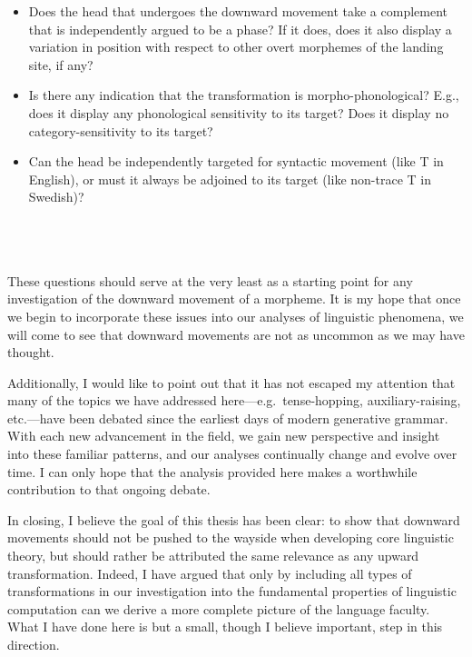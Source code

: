 \singlespacing
\begin{minipage}{5in}
\begin{itemize}
\item Does the head that undergoes the downward movement take a complement that is independently argued to be a phase? If it does, does it also display a variation in position with respect to other overt morphemes of the landing site, if any?
\item Is there any indication that the transformation is morpho-phonological? E.g., does it display any phonological sensitivity to its target? Does it display no category-sensitivity to its target?
\item Can the head be independently targeted for syntactic movement (like T in English), or must it always be adjoined to its target (like non-trace T in Swedish)?
\end{itemize}
\end{minipage}\\\\\\
\onehalfspacing
These questions should serve at the very least as a starting point for any investigation of the downward movement of a morpheme. It is my hope that once we begin to incorporate these issues into our analyses of linguistic phenomena, we will come to see that downward movements are not as uncommon as we may have thought.

Additionally, I would like to point out that it has not escaped my attention that many of the topics we have addressed here---e.g.\ tense-hopping, auxiliary-raising, etc.---have been debated since the earliest days of modern generative grammar. With each new advancement in the field, we gain new perspective and insight into these familiar patterns, and our analyses continually change and evolve over time. I can only hope that the analysis provided here makes a worthwhile contribution to that ongoing debate.

In closing, I believe the goal of this thesis has been clear: to show that downward movements should not be pushed to the wayside when developing core linguistic theory, but should rather be attributed the same relevance as any upward transformation. Indeed, I have argued that only by including all types of transformations in our investigation into the fundamental properties of linguistic computation can we derive a more complete picture of the language faculty. What I have done here is but a small, though I believe important, step in this direction.



